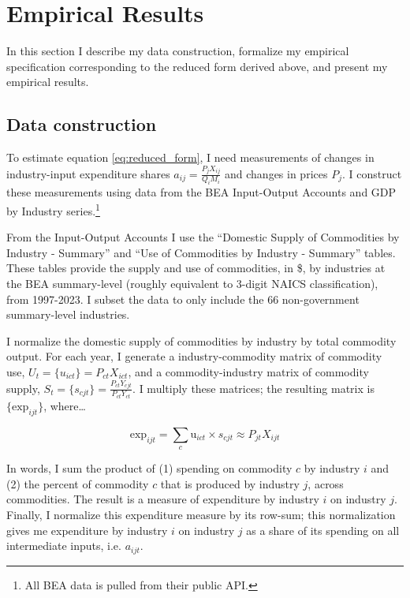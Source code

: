 \documentclass[11pt]{article}
\begin{document}
\section{Empirical Results}
\label{sec:empirical}

In this section I describe my data construction, formalize my empirical specification corresponding to the reduced form derived above, and present my empirical results.

\subsection{Data construction}

To estimate equation \ref{eq:reduced_form}, I need measurements of changes in industry-input expenditure shares $a_{ij} = \frac{P_j X_{ij}}{Q_i M_i}$ and changes in prices $P_j$. I construct these measurements using data from the BEA Input-Output Accounts and GDP by Industry series.\footnote{All BEA data is pulled from their public API.} 

From the Input-Output Accounts I use the ``Domestic Supply of Commodities by Industry - Summary'' and ``Use of Commodities by Industry - Summary'' tables. These tables provide the supply and use of commodities, in \$, by industries at the BEA summary-level (roughly equivalent to 3-digit NAICS classification), from 1997-2023. I subset the data to only include the 66 non-government summary-level industries.

I normalize the domestic supply of commodities by industry by total commodity output. For each year, I generate a industry-commodity matrix of commodity use, $U_t = \{u_{ict}\} = P_{ct} X_{ict}$, and a commodity-industry matrix of commodity supply, $S_t = \{s_{cjt}\} = \frac{P_{ct} Y_{cjt}}{P_{ct} Y_{ct}}$. I multiply these matrices; the resulting matrix is $\{\text{exp}_{ijt}\}$, where\dots 

\[
\text{exp}_{ijt} = \sum_c \text{u}_{ict} \times s_{cjt} \approx P_{jt} X_{ijt}
\]

In words, I sum the product of (1) spending on commodity $c$ by industry $i$ and (2) the percent of commodity $c$ that is produced by industry $j$, across commodities. The result is a measure of expenditure by industry $i$ on industry $j$. Finally, I normalize this expenditure measure by its row-sum; this normalization gives me expenditure by industry $i$ on industry $j$ as a share of its spending on all intermediate inputs, i.e. $a_{ijt}$.
\end{document}

